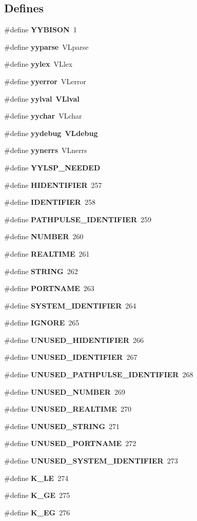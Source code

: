 \subsection*{Defines}
\begin{CompactItemize}
\item 
\#define {\bf YYBISON}\ 1
\item 
\#define {\bf yyparse}\ VLparse
\item 
\#define {\bf yylex}\ VLlex
\item 
\#define {\bf yyerror}\ VLerror
\item 
\#define {\bf yylval}\ {\bf VLlval}
\item 
\#define {\bf yychar}\ VLchar
\item 
\#define {\bf yydebug}\ {\bf VLdebug}
\item 
\#define {\bf yynerrs}\ VLnerrs
\item 
\#define {\bf YYLSP\_\-NEEDED}
\item 
\#define {\bf HIDENTIFIER}\ 257
\item 
\#define {\bf IDENTIFIER}\ 258
\item 
\#define {\bf PATHPULSE\_\-IDENTIFIER}\ 259
\item 
\#define {\bf NUMBER}\ 260
\item 
\#define {\bf REALTIME}\ 261
\item 
\#define {\bf STRING}\ 262
\item 
\#define {\bf PORTNAME}\ 263
\item 
\#define {\bf SYSTEM\_\-IDENTIFIER}\ 264
\item 
\#define {\bf IGNORE}\ 265
\item 
\#define {\bf UNUSED\_\-HIDENTIFIER}\ 266
\item 
\#define {\bf UNUSED\_\-IDENTIFIER}\ 267
\item 
\#define {\bf UNUSED\_\-PATHPULSE\_\-IDENTIFIER}\ 268
\item 
\#define {\bf UNUSED\_\-NUMBER}\ 269
\item 
\#define {\bf UNUSED\_\-REALTIME}\ 270
\item 
\#define {\bf UNUSED\_\-STRING}\ 271
\item 
\#define {\bf UNUSED\_\-PORTNAME}\ 272
\item 
\#define {\bf UNUSED\_\-SYSTEM\_\-IDENTIFIER}\ 273
\item 
\#define {\bf K\_\-LE}\ 274
\item 
\#define {\bf K\_\-GE}\ 275
\item 
\#define {\bf K\_\-EG}\ 276

\end{CompactItemize}
